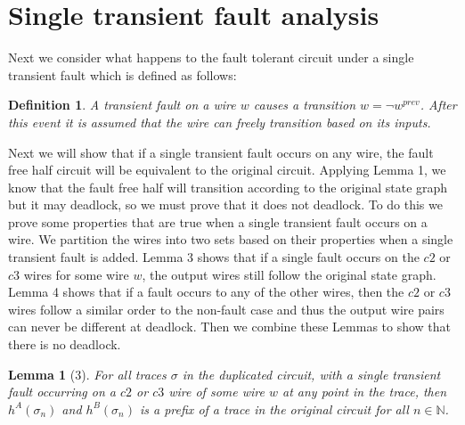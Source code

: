 \documentclass[12pt]{report}
\newtheorem*{definition}{Definition}
\newtheorem*{lemma}{Lemma}
\begin{document}
\section{Single transient fault analysis}
Next we consider what happens to the fault tolerant circuit under a single transient fault which is defined as follows:
\begin{definition}A transient fault on a wire $w$ causes a transition $w= \lnot w^{prev}$.  After this event it is assumed that the wire can freely transition based on its inputs. %
\end{definition}
Next we will show that if a single transient fault occurs on any wire, the fault free half circuit will be equivalent to the original circuit.  Applying Lemma 1, we know that the fault free half will transition according to the original state graph but it may deadlock, so we must prove that it does not deadlock.  To do this we prove some properties that are true when a single transient fault occurs on a wire.  We partition the wires into two sets based on their properties when a single transient fault is added.  Lemma 3 shows that if a single fault occurs on the $c2$ or $c3$ wires for some wire $w$, the output wires still follow the original state graph.  Lemma 4 shows that if a fault occurs to any of the other wires, then the $c2$ or $c3$ wires follow a similar order to the non-fault case and thus the output wire pairs can never be different at deadlock.  Then we combine these Lemmas to show that there is no deadlock.
\begin{lemma}[3]
For all traces $\sigma$ in the duplicated circuit, with a single transient fault occurring on a $c2$ or $c3$ wire of some wire $w$ at any point in the trace, then $h^{A}(\sigma_n)$ and $h^{B}(\sigma_n)$ is a prefix of a trace in the original circuit for all $n \in \mathbb{N}$.
\end{lemma}
\end{document}
